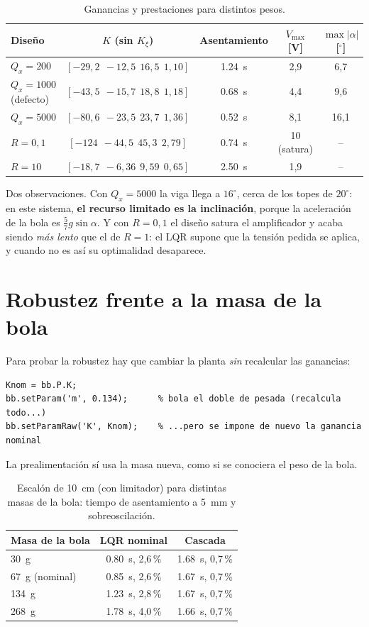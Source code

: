 \begin{table}[H]
\centering\small
\begin{tabular}{@{}lcccc@{}}
\toprule
Diseño & $K$ (sin $K_\xi$) & Asentamiento & $V_{\max}$ [V] & $\max|\alpha|$ [$^\circ$]\\
\midrule
$Q_x=200$ & $[-29{,}2\ \ -12{,}5\ \ 16{,}5\ \ 1{,}10]$ & \SI{1.24}{s} & 2,9 & 6,7\\
$Q_x=1000$ (defecto) & $[-43{,}5\ \ -15{,}7\ \ 18{,}8\ \ 1{,}18]$ & \SI{0.68}{s} & 4,4 & 9,6\\
$Q_x=5000$ & $[-80{,}6\ \ -23{,}5\ \ 23{,}7\ \ 1{,}36]$ & \SI{0.52}{s} & 8,1 & 16,1\\
$R=0{,}1$ & $[-124\ \ -44{,}5\ \ 45{,}3\ \ 2{,}79]$ & \SI{0.74}{s} & 10 (satura) & --\\
$R=10$ & $[-18{,}7\ \ -6{,}36\ \ 9{,}59\ \ 0{,}65]$ & \SI{2.50}{s} & 1,9 & --\\
\bottomrule
\end{tabular}
\caption{Ganancias y prestaciones para distintos pesos.}
\end{table}

Dos observaciones. Con $Q_x=5000$ la viga llega a $16^\circ$, cerca de los topes de $20^\circ$: en este sistema, \textbf{el recurso limitado es la inclinación}, porque la aceleración de la bola es $\tfrac57g\sin\alpha$. Y con $R=0{,}1$ el diseño satura el amplificador y acaba siendo \emph{más lento} que el de $R=1$: el LQR supone que la tensión pedida se aplica, y cuando no es así su optimalidad desaparece.

\section{Robustez frente a la masa de la bola}
\label{sec:robustez}

Para probar la robustez hay que cambiar la planta \emph{sin} recalcular las ganancias:
\begin{lstlisting}
Knom = bb.P.K;
bb.setParam('m', 0.134);      % bola el doble de pesada (recalcula todo...)
bb.setParamRaw('K', Knom);    % ...pero se impone de nuevo la ganancia nominal
\end{lstlisting}
La prealimentación sí usa la masa nueva, como si se conociera el peso de la bola.

\begin{table}[H]
\centering\small
\begin{tabular}{@{}lcc@{}}
\toprule
Masa de la bola & LQR nominal & Cascada\\
\midrule
\SI{30}{g} & \SI{0.80}{s}, 2,6\,\% & \SI{1.68}{s}, 0,7\,\%\\
\SI{67}{g} (nominal) & \SI{0.85}{s}, 2,6\,\% & \SI{1.67}{s}, 0,7\,\%\\
\SI{134}{g} & \SI{1.23}{s}, 2,8\,\% & \SI{1.67}{s}, 0,7\,\%\\
\SI{268}{g} & \SI{1.78}{s}, 4,0\,\% & \SI{1.66}{s}, 0,7\,\%\\
\bottomrule
\end{tabular}
\caption{Escalón de \SI{10}{cm} (con limitador) para distintas masas de la bola: tiempo de asentamiento a \SI{5}{mm} y sobreoscilación.}
\label{tab:masa}
\end{table}

